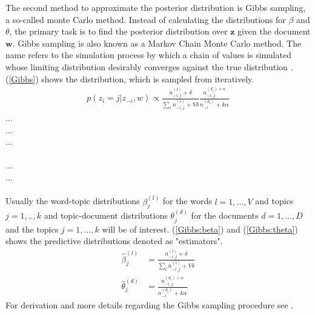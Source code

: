 \documentclass[11pt,a4paper]{article}
\begin{document}
The second method to approximate the posterior distribution is Gibbs sampling, a so-called monte Carlo method. Instead of calculating the distributions for $\beta$ and $\theta$, the primary task is to find the posterior distribution over $\textbf{z}$ given the document $\textbf{w}$. Gibbs sampling is also known as a Markov Chain Monte Carlo method. The name refers to the simulation process by which a chain of values is simulated whose limiting distribution desirably converges against the true distribution \cite{Griffiths2006}. (\ref{Gibbs}) shows the distribution, which is sampled from iteratively.
\begin{align}\label{Gibbs}
p(z_i=j|z_{-i},w)\propto \frac{n_{-i,j}^{(l)}+\delta}{\sum_t n_{-i,j}^{(t)}+V\delta}
\frac{n_{-i,j}^{(d_i)+\alpha}}{n_{-i}^{(d_i)}+k\alpha}
\end{align}
 		... \\
   		... \\
	... \\
\makebox[1cm][l]{}						\\
				... \\
\makebox[1cm][l]{$\delta,\alpha$} 	... \\
\\
Usually the word-topic distributions $\beta_{j}^{(l)}$ for the words $l=1,...,V$ and topics $j=1,..,k$ and topic-document distributions $\theta_j^{(d)}$ for the documents $d=1,...,D$ and the topics $j=1,...,k$ will be of interest. (\ref{Gibbs:beta}) and (\ref{Gibbs:theta}) shows the predictive distributions denoted as "estimators". 
\begin{align}
\hat\beta_{j}^{(l)}&=\frac{n_{-i,j}^{(l)}+\delta}{\sum_t n_{-i,j}^{(t)}+V\delta} \label{Gibbs:beta} \\
\hat\theta_j^{(d)}&= \frac{n_{-i,j}^{(d_i)+\alpha}}{n_{-i}^{(d_i)}+k\alpha} \label{Gibbs:theta}
\end{align}
For derivation and more details regarding the Gibbs sampling procedure see \cite{Griffiths2006}.
\end{document}
